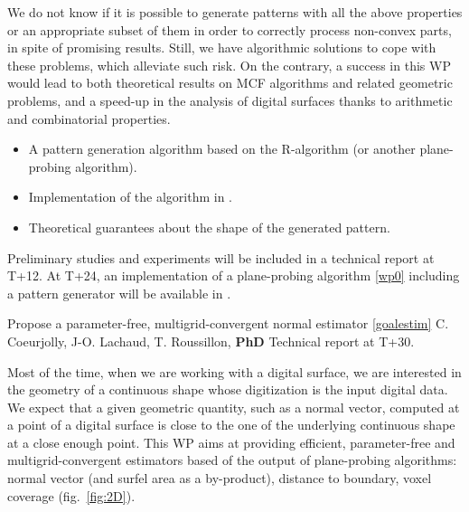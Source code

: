 \Risks
We do not know if it is possible to generate patterns with all the above properties
or an appropriate subset of them in order to correctly process non-convex parts,
in spite of promising results. Still, we have algorithmic solutions
\cite{LPRJMIV2017} to cope with these problems, which alleviate such risk. 
On the contrary, a success in this WP would lead to both theoretical results
on MCF algorithms and related geometric problems, and a speed-up in the analysis
of digital surfaces thanks to arithmetic and combinatorial properties.  

\Success
\begin{itemize}
  \item A pattern generation algorithm based on the R-algorithm (or another plane-probing algorithm).
  \item Implementation of the algorithm in \DGtal.
  \item Theoretical guarantees about the shape of the generated pattern. 
\end{itemize}

Preliminary studies and experiments will be included in a technical report at T+12.
At T+24, an implementation of a plane-probing algorithm \ref{wp0} including a pattern
generator will be available in \DGtal. 




\medskip
{}
   {Propose a parameter-free, multigrid-convergent normal estimator \ref{goalestim}}
   {C. Coeurjolly, J-O. Lachaud, T. Roussillon, \textbf{PhD}}
   {Technical report at T+30.}
\medskip

 Most of the time, when we are working with a digital surface, we are 
interested in the geometry of a continuous shape whose digitization is the input digital data.
We expect that a given geometric quantity, such as a normal vector, computed at a point of a digital surface
is close to the one of the underlying continuous shape at a close enough point. 
This WP aims at providing efficient, parameter-free and multigrid-convergent estimators based of
the output of plane-probing algorithms: normal vector (and surfel area as a by-product),
distance to boundary, voxel coverage (fig.~\ref{fig:2D}).


